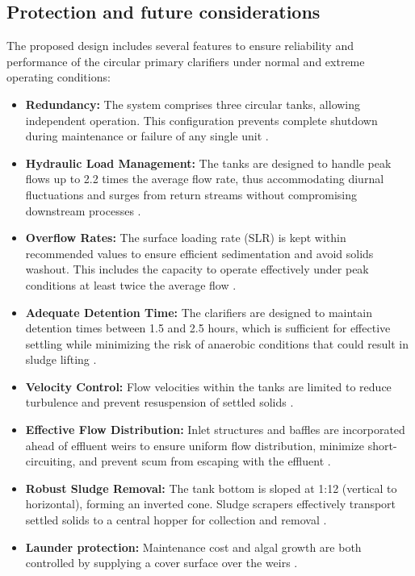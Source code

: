 \documentclass[11pt]{article}
\begin{document}
\subsection{Protection and future considerations}

The proposed design includes several features 
to ensure reliability and performance of the 
circular primary clarifiers under normal and extreme operating conditions:
\begin{itemize}
    \item \textbf{Redundancy:} The system comprises three circular tanks, allowing independent operation. This configuration prevents complete shutdown during maintenance or failure of any single unit \cite{davis2010water}.
    
    \item \textbf{Hydraulic Load Management:} The tanks are designed to handle peak flows up to 2.2 times the average flow rate, thus accommodating diurnal fluctuations and surges from return streams without compromising downstream processes \cite{davis2010water}.
    
    \item \textbf{Overflow Rates:} The surface loading rate (SLR) is kept within recommended values to ensure efficient sedimentation and avoid solids washout. This includes the capacity to operate effectively under peak conditions at least twice the average flow \cite{davis2010water,metcalf_2014_wastewater}.
    
    \item \textbf{Adequate Detention Time:} The clarifiers are designed to maintain detention times between 1.5 and 2.5 hours, which is sufficient for effective settling while minimizing the risk of anaerobic conditions that could result in sludge lifting \cite{davis2010water}.
    
    \item \textbf{Velocity Control:} Flow velocities within the tanks are limited to reduce turbulence and prevent resuspension of settled solids \cite{davis2010water}.
    
    \item \textbf{Effective Flow Distribution:} Inlet structures and baffles are incorporated ahead of effluent weirs to ensure uniform flow distribution, minimize short-circuiting, and prevent scum from escaping with the effluent \cite{metcalf_2014_wastewater}.
    
    \item \textbf{Robust Sludge Removal:} The tank bottom is sloped at 1:12 (vertical to horizontal), forming an inverted cone. Sludge scrapers effectively transport settled solids to a central hopper for collection and removal \cite{metcalf_2014_wastewater}.
    \item \textbf{Launder protection: } Maintenance cost and algal growth are both controlled by supplying a cover surface over the weirs \cite{metcalf_2014_wastewater}.
\end{itemize}
\end{document}
